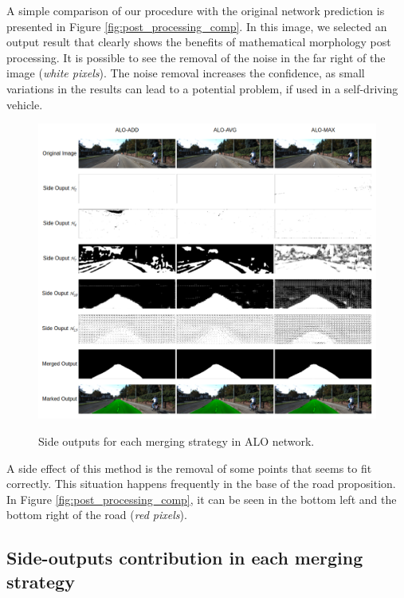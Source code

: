 A simple comparison of our procedure with the original network prediction is presented in Figure \ref{fig:post_processing_comp}. In this image, we selected an output result that clearly shows the benefits of mathematical morphology post processing. It is possible to see the removal of the noise in the far right of the image (\textit{white pixels}). The noise removal increases the confidence, as small variations in the results can lead to a potential problem, if used in a self-driving vehicle. 

\begin{figure}
  \caption{Side outputs for each merging strategy in ALO network.}
  \centering
  \includegraphics[width=1.0\textwidth]{figures/falreis/side_outputs.png}
  \label{fig:side_outputs}
\end{figure}



A side effect of this method is the removal of some points that seems to fit correctly. This situation happens frequently in the base of the road proposition. In Figure \ref{fig:post_processing_comp}, it can be seen in the bottom left and the bottom right of the road (\textit{red pixels}).



\subsection{Side-outputs contribution in each merging strategy}
\label{ssec:merging_learn}

